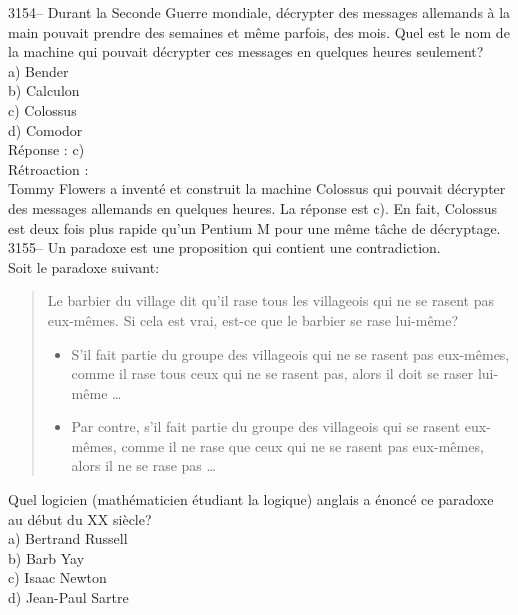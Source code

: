 \documentclass[letterpaper, 12pt]{article}
\begin{document}
3154-- Durant la Seconde Guerre mondiale, d\'ecrypter des messages allemands \`a la main pouvait prendre des semaines et m\^eme parfois, des mois. Quel est le nom de la machine qui pouvait d\'ecrypter ces messages en quelques heures seulement?\\

a) Bender\\
b) Calculon\\
c) Colossus\\
d) Comodor\\

R\'eponse : c)\\

R\'etroaction :\\
Tommy Flowers a invent\'e et construit la machine Colossus qui pouvait d\'ecrypter des messages allemands en quelques heures. La r\'eponse est c). En fait, Colossus est deux fois plus rapide qu'un Pentium M pour une m\^eme t\^ache de d\'ecryptage.\\



3155-- Un paradoxe est une proposition qui contient une contradiction.\\
Soit le paradoxe suivant:\\
\begin{quote}
Le barbier du village dit qu'il rase tous les villageois qui ne se rasent pas eux-m\^emes. Si cela est vrai, est-ce que le barbier se rase lui-m\^eme?\\
\begin{itemize}
\item S'il fait partie du groupe des villageois qui ne se rasent pas eux-m\^emes, comme il rase tous ceux qui ne se rasent pas, alors il doit se raser lui-m\^eme \dots\\
\item Par contre, s'il fait partie du groupe des villageois qui se rasent eux-m\^emes, comme il ne rase que ceux qui ne se rasent pas eux-m\^emes, alors il ne se rase pas \dots\\
\end{itemize}
\end{quote}

Quel logicien (math\'ematicien \'etudiant la logique) anglais a \'enonc\'e ce paradoxe au d\'ebut du {\scriptsize XX\ieme{}} si\`ecle?\\

a) Bertrand Russell\\
b) Barb Yay\\
c) Isaac Newton\\
d) Jean-Paul Sartre\\
\end{document}
